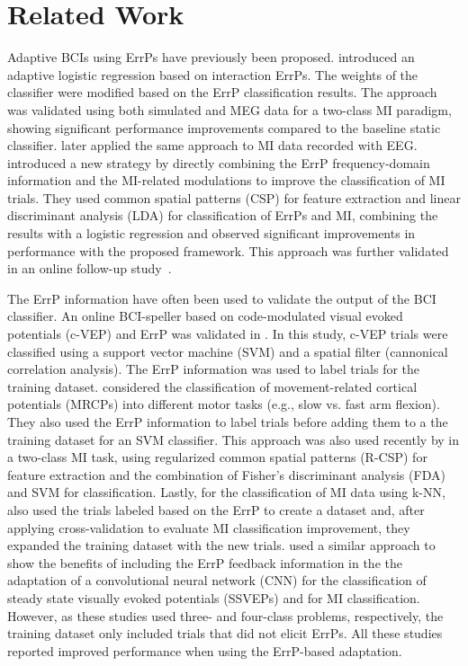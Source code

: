\section{Related Work}
\label{sec:related_work}
    Adaptive BCIs using ErrPs have previously been proposed.
    \cite{llera_use_2011} introduced an adaptive logistic regression based on interaction ErrPs. The weights of the classifier were modified based on the ErrP classification results. The approach was validated using both simulated and MEG data for a two-class MI paradigm, showing significant performance improvements compared to the baseline static classifier. \cite{schiatti_effect_2019} later applied the same approach to MI data recorded with EEG. 
    \cite{mousavi_improving_2017} introduced a new strategy by directly combining the ErrP frequency-domain information and the MI-related modulations to improve the classification of MI trials. They used common spatial patterns (CSP) for feature extraction and linear discriminant analysis (LDA) for classification of ErrPs and MI, combining the results with a logistic regression and observed significant improvements in performance with the proposed framework. This approach was further validated in an online follow-up study~\citep{mousavi_hybrid_2020}. 
    
    The ErrP information have often been used to validate the output of the BCI classifier. 
    An online BCI-speller based on code-modulated visual evoked potentials (c-VEP) and ErrP was validated in \cite{spuler_online_2012}. In this study, c-VEP trials were classified using a support vector machine (SVM) and a spatial filter (cannonical correlation analysis). The ErrP information was used to label trials for the training dataset.
    \cite{artusi_performance_2011} considered the classification of movement-related cortical potentials (MRCPs) into different motor tasks (e.g., slow vs. fast arm flexion). They also used the ErrP information to label trials before adding them to a the training dataset for an SVM classifier.
    This approach was also used recently by \cite{tao_enhancement_2023} in a two-class MI task, using regularized common spatial patterns (R-CSP) for feature extraction and the combination of Fisher's discriminant analysis (FDA) and SVM for classification. Lastly, for the classification of MI data using k-NN, \cite{haotian_online_2023} also used the trials labeled based on the ErrP to create a dataset and, after applying cross-validation to evaluate MI classification improvement, they expanded the training dataset with the new trials. 
    \cite{chiang_closed-loop_2021} used a similar approach to show the benefits of including the ErrP feedback information in the the adaptation of a convolutional neural network (CNN) for the classification of steady state visually evoked potentials (SSVEPs) and \cite{wang_toward_2024} for MI classification. However, as these studies used three- and four-class problems, respectively, the training dataset only included trials that did not elicit ErrPs. 
    All these studies reported improved performance when using the ErrP-based adaptation.